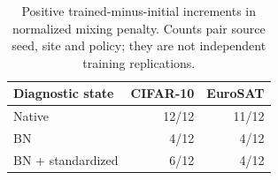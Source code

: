 \begin{table}[t]
\centering\footnotesize
\caption{Positive trained-minus-initial increments in normalized mixing penalty. Counts pair source seed, site and policy; they are not independent training replications.}
\label{tab:statistics}
\begin{tabular}{lrr}
\toprule
Diagnostic state & CIFAR-10 & EuroSAT \\
\midrule
Native & 12/12 & 11/12 \\
BN & 4/12 & 4/12 \\
BN + standardized & 6/12 & 4/12 \\
\bottomrule
\end{tabular}
\end{table}
